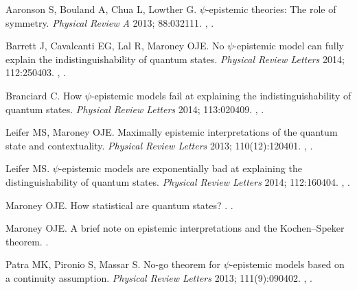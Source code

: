 \documentclass[DIV=calc,fontsize=12pt]{scrartcl} %
\theoremstyle{definition}
\theoremstyle{plain}
\begin{document}
\begin{thebibliography}{999}
Aaronson S, Bouland A, Chua L, Lowther G.
\newblock $\psi$-epistemic theories: The role of symmetry.
\newblock \emph{Physical Review A} 2013; 88:032111.
\newblock \href {http://arxiv.org/abs/1303.2834} {},
\href {http://dx.doi.org/10.1103/PhysRevA.88.032111}
{}.

Barrett J, Cavalcanti EG, Lal R, Maroney OJE.
\newblock No $\psi$-epistemic model can fully explain the indistinguishability
of quantum states.
\newblock \emph{Physical Review Letters} 2014; 112:250403.
\newblock \href {http://arxiv.org/abs/1310.8302} {},
\href {http://dx.doi.org/10.1103/PhysRevLett.112.250403}
{}.

Branciard C.
\newblock How $\psi$-epistemic models fail at explaining the
indistinguishability of quantum states.
\newblock \emph{Physical Review Letters} 2014; 113:020409.
\newblock \href {http://arxiv.org/abs/1407.3005} {},
\href {http://dx.doi.org/10.1103/PhysRevLett.113.020409}
{}.

Leifer MS, Maroney OJE.
\newblock Maximally epistemic interpretations of the quantum state and
contextuality.
\newblock \emph{Physical Review Letters} 2013; 110(12):120401.
\newblock \href {http://arxiv.org/abs/1208.5132} {},
\href {http://dx.doi.org/10.1103/PhysRevLett.110.120401}
{}.

Leifer MS.
\newblock $\psi$-epistemic models are exponentially bad at explaining the
distinguishability of quantum states.
\newblock \emph{Physical Review Letters} 2014; 112:160404.
\newblock \href {http://arxiv.org/abs/1401.7996} {},
\href {http://dx.doi.org/10.1103/PhysRevLett.112.160404}
{}.

Maroney OJE.
\newblock How statistical are quantum states?
.
\newblock \href {http://arxiv.org/abs/1207.6906} {}.

Maroney OJE.
\newblock A brief note on epistemic interpretations and the Kochen--Speker theorem.
\newblock \href {http://arxiv.org/abs/1207.7192} {}.

Patra MK, Pironio S, Massar S.
\newblock No-go theorem for $\psi$-epistemic models based on a continuity
assumption.
\newblock \emph{Physical Review Letters} 2013; 111(9):090402.
\newblock \href {http://arxiv.org/abs/1211.1179} {},
\href {http://dx.doi.org/10.1103/PhysRevLett.111.090402}
{}.


\end{thebibliography}
\end{document}
